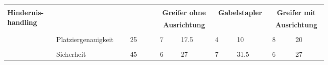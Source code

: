 \documentclass[main.tex]{subfiles} %
\begin{document}
\begin{landscape}
    \newpage
    \begin{table}[ht]
        \centering
        \begin{tabular}{|p{0.11\linewidth}|p{0.18\linewidth}|p{0.085\linewidth}|p{0.057\linewidth}|p{0.07\linewidth}|p{0.057\linewidth}|p{0.07\linewidth}|p{0.057\linewidth}|p{0.07\linewidth}|}
            \hline
                                                           & \multicolumn{2}{c|}{}               & \multicolumn{2}{c|}{}                      & \multicolumn{2}{c|}{}                       & \multicolumn{2}{c|}{}                                                             \\[-9pt]
            \multirow{6}{4em}{\textbf{Hindernis-handling}} & \multicolumn{2}{c|}{}               & \multicolumn{2}{c|}{\textbf{Greifer ohne}} & \multicolumn{2}{c|}{\textbf{Gabelstapler}}  & \multicolumn{2}{c|}{\textbf{Greifer mit}}                                         \\[1pt]
                                                           & \multicolumn{2}{c|}{}               & \multicolumn{2}{c|}{\textbf{Ausrichtung}}  & \multicolumn{2}{c|}{\textbf{}}              & \multicolumn{2}{c|}{\textbf{Ausrichtung}}                                         \\[1pt]
            \cline{2-9}
                                                           &                                     &                                            &                                             &                                             &   &               &   &             \\[-9pt]
                                                           & Platziergenauigkeit                 & 25                                         & 7                                           & 17.5                                        & 4 & 10            & 8 & 20          \\[1pt]
            \cline{2-9}
                                                           &                                     &                                            &                                             &                                             &   &               &   &             \\[-9pt]
                                                           & Sicherheit                          & 45                                         & 6                                           & 27                                          & 7 & 31.5          & 6 & 27          \\[1pt]

\end{tabular}
\end{table}
\end{landscape}
\end{document}
